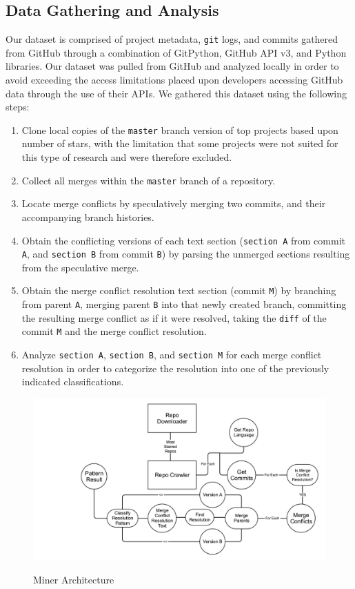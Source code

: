 \documentclass{sig-alternate-05-2015}
\begin{document}
\subsection{Data Gathering and Analysis}
Our dataset is comprised of project metadata, \texttt{git} logs, and commits gathered from GitHub through a combination of GitPython, GitHub API v3, and Python libraries. Our dataset was pulled from GitHub and analyzed locally in order to avoid exceeding the access limitations placed upon developers accessing GitHub data through the use of their APIs. We gathered this dataset using the following steps:\\
\begin{enumerate}
\item Clone local copies of the \texttt{master} branch version of top projects based upon number of stars, with the limitation that some projects were not suited for this type of research and were therefore excluded.
\item Collect all merges within the \texttt{master} branch of a repository.
\item Locate merge conflicts by speculatively merging two commits, and their accompanying branch histories.
\item Obtain the conflicting versions of each text section (\texttt{section A} from commit \texttt{A}, and \texttt{section B} from commit \texttt{B}) by parsing the unmerged sections resulting from the speculative merge.
\item Obtain the merge conflict resolution text section (commit \texttt{M}) by branching from parent \texttt{A}, merging parent \texttt{B} into that newly created branch, committing the resulting merge conflict as if it were resolved, taking the \texttt{diff} of the commit \texttt{M} and the merge conflict resolution.
\item Analyze \texttt{section A}, \texttt{section B}, and \texttt{section M} for each merge conflict resolution in order to categorize the resolution into one of the previously indicated classifications.
\end{enumerate}

\begin{figure}[t]
\caption{Miner Architecture}
\includegraphics[width=\textwidth]{miningarchitecture}
\centering
\label{figure:f1}
\end{figure}
\end{document}
